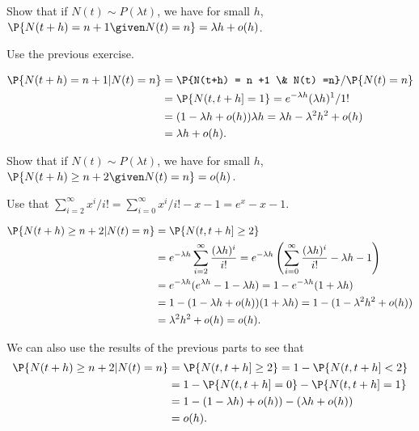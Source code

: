 \begin{exercise}
  Show that if $N(t) \sim P(\lambda t)$, we have for small $h$,
 $\P{N(t+h) = n+1 \given N(t) = n} = \lambda h + o(h)$. 
    \begin{hint} Use the previous exercise.
    \end{hint}
\begin{solution}
  \begin{align*}
  \P{N(t+h) = n +1 | N(t) = n} 
&=  \P{N(t+h) = n +1 \& N(t) =n}/\P{N(t) = n}\\
&= \P{N(t, t+h] = 1} = e^{-\lambda h} (\lambda h)^1/1! \\
&= (1-\lambda h + o(h))\lambda h  = \lambda h - \lambda^2 h^2 + o(h) \\
&= \lambda h + o(h). 
  \end{align*}
\end{solution}
\end{exercise}

\begin{exercise}
  Show that if $N(t) \sim P(\lambda t)$, we have for small $h$,
 $\P{N(t+h) \geq n+2 \given N(t) = n} = o(h)$.
    \begin{hint}
 Use that  $\sum_{i=2}^\infty x^i/i! = \sum_{i=0}^\infty x^i/i! - x -1 = e^x -x - 1$.
    \end{hint}
\begin{solution}
  \begin{align*}
  \P{N(t+h) \geq n+2 | N(t) = n} 
&= \P{N(t, t+h] \geq 2} \\
&= e^{-\lambda h} \sum_{i=2}^\infty \frac{(\lambda h)^i}{i!} 
= e^{-\lambda h} \left(\sum_{i=0}^\infty \frac{(\lambda h)^i}{i!} - \lambda h - 1\right)\\
&= e^{-\lambda h}(e^{\lambda h} - 1 - \lambda h) 
= 1 - e^{-\lambda h}(1 + \lambda h) \\
&= 1 - (1-\lambda h + o(h))(1+\lambda h) 
= 1 - (1-\lambda^2 h^2 + o(h)) \\
&= \lambda^2 h^2 + o(h) = o(h).
  \end{align*}

We can also use the results of the previous parts to see that
\begin{align*}
  \P{N(t+h) \geq n+2 | N(t) = n} 
&= \P{N(t, t+h] \geq 2} = 1- \P{N(t, t+h]<2} \\
&= 1 - \P{N(t, t+h]= 0} - \P{N(t, t+h]=1} \\
&= 1 - (1-\lambda h) + o(h) ) - (\lambda h + o(h)) \\
&= o(h).
\end{align*}
\end{solution}
\end{exercise}

